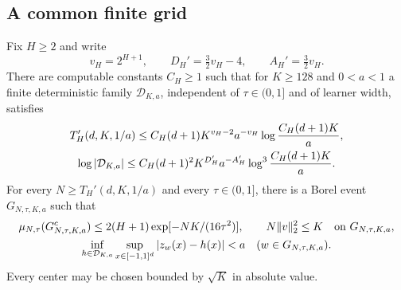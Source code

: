 \subsection{A common finite grid}

\begin{lemma}
\label{lem:scaled-mf-cover}
Fix $H\geq2$ and write
\[
 v_H=2^{H+1},\qquad D_H'=\tfrac32v_H-4,
 \qquad A_H'=\tfrac32v_H.
\]
There are computable constants $C_H\geq1$ such that for $K\geq128$
and $0<a<1$ a finite deterministic family $\mathcal D_{K,a}$,
independent of $\tau\in(0,1]$ and of learner width, satisfies
\begin{gather}
 T_H'(d,K,1/a)\leq
 C_H(d+1)K^{v_H-2}a^{-v_H}
                    \log\frac{C_H(d+1)K}{a},\notag\\
 \log|\mathcal D_{K,a}|\leq
 C_H(d+1)^2K^{D_H'}a^{-A_H'}
                    \log^3\frac{C_H(d+1)K}{a}.
 \label{eq:scaled-mf-cover-bounds}
\end{gather}
For every $N\geq T_H'(d,K,1/a)$ and every $\tau\in(0,1]$, there is
a Borel event $G_{N,\tau,K,a}$ such that
\begin{gather*}
 \mu_{N,\tau}(G_{N,\tau,K,a}^c)
       \leq2(H+1)\exp[-NK/(16\tau^2)],\qquad
 N\|v\|_2^2\leq K\quad\hbox{on }G_{N,\tau,K,a},\\
 \inf_{h\in\mathcal D_{K,a}}\sup_{x\in[-1,1]^d}|z_w(x)-h(x)|<a
       \quad(w\in G_{N,\tau,K,a}).
\end{gather*}
Every center may be chosen bounded by $\sqrt K$ in absolute value.
\end{lemma}
